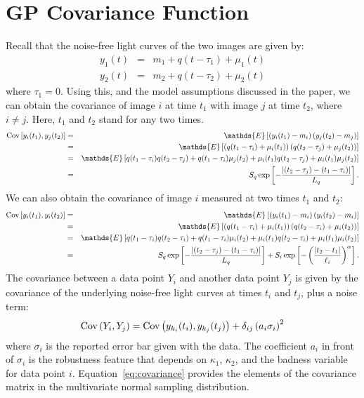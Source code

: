 \documentclass[useAMS,usenatbib, a4paper]{mn2e} \usepackage{natbib}
\begin{document}
\appendix
\onecolumn

\section{GP Covariance Function}
Recall that the noise-free light curves of the two images are given by:
\begin{eqnarray}
y_1(t) &=& m_1 + q(t - \tau_1) + \mu_1(t) \\
y_2(t) &=& m_2 + q(t - \tau_2) + \mu_2(t)
\end{eqnarray}
where $\tau_1 = 0$.
Using this, and the model assumptions discussed in the paper, we can obtain the
covariance of image $i$ at time $t_1$ with image $j$ at time $t_2$, where
$i \neq j$. Here, $t_1$ and $t_2$ stand for any two times.
\begin{eqnarray}
\textnormal{Cov}\left[y_i(t_1), y_j(t_2)\right]
&=& \mathds{E}\left[\left(y_i(t_1) - m_i\right)\left(y_j(t_2) - m_j\right)\right]\\
&=& \mathds{E}\left[\left(q(t_1 - \tau_i) + \mu_i(t_1)\right)
\left(q(t_2 - \tau_j) + \mu_j(t_2)\right)\right]\\
&=& \mathds{E}\left[q(t_1 - \tau_i)q(t_2 - \tau_j) + q(t_1 - \tau_i)\mu_j(t_2)
+ \mu_i(t_1)q(t_2 - \tau_j) + \mu_i(t_1)\mu_j(t_2)
\right]\\
&=& S_q\exp
\left[-\frac{|(t_2 -\tau_j)- (t_1-\tau_i)|}{L_q}\right].
\end{eqnarray}
We can also obtain the covariance of image $i$ measured at two times $t_1$ and
$t_2$:
\begin{eqnarray}
\textnormal{Cov}\left[y_i(t_1), y_i(t_2)\right]
&=& \mathds{E}\left[\left(y_i(t_1) - m_i\right)\left(y_i(t_2) - m_i\right)\right]\\
&=& \mathds{E}\left[\left(q(t_1 - \tau_i) + \mu_i(t_1)\right)
\left(q(t_2 - \tau_i) + \mu_i(t_2)\right)\right]\\
&=& \mathds{E}\left[q(t_1 - \tau_i)q(t_2 - \tau_i) + q(t_1 - \tau_i)\mu_i(t_2)
+ \mu_i(t_1)q(t_2 - \tau_i) + \mu_i(t_1)\mu_i(t_2)
\right]\\
&=& S_q\exp
\left[-\frac{|(t_2 -\tau_j)- (t_1-\tau_i)|}{L_q}\right] +
S_i\exp\left[
-\left(\frac{|t_2 - t_1|
}{\ell_i}\right)^\alpha
\right]
.
\end{eqnarray}
The covariance between a data point $Y_i$ and another data point $Y_j$ is
given by the covariance of the underlying noise-free light curves at times $t_i$
and $t_j$, plus a noise term:
\begin{eqnarray}
\textnormal{Cov}\left(
Y_i, Y_j
\right) = \textnormal{Cov}\left(y_{k_i}(t_i), y_{k_j}(t_j)\right)
+ \delta_{ij}\left(a_i\sigma_i\right)^2\label{eq:covariance}
\end{eqnarray}
where $\sigma_i$ is the reported error bar given with the data. The coefficient
$a_i$
in front of $\sigma_i$ is the robustness feature that depends on $\kappa_1$,
$\kappa_2$, and the badness variable for data point $i$. Equation~\ref{eq:covariance}
provides the elements of the covariance matrix in the multivariate normal
sampling distribution.
\end{document}

